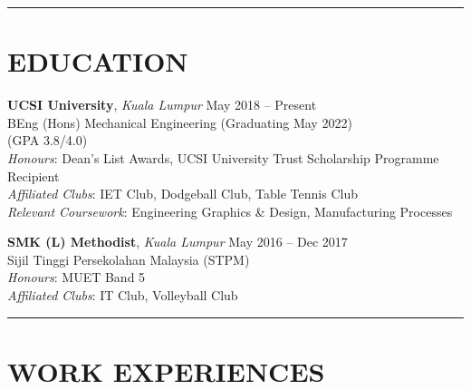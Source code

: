 \documentclass{article}
\begin{document}


\vspace{.09cm}
\noindent\rule[0.5ex]{\linewidth}{1pt}
\vspace{-1.5em}
\section{EDUCATION}
\begin{addmargin}[2em]{0em}
{\flushleft \bf UCSI University}, \textit{Kuala Lumpur} \hfill May 2018 -- Present\\
BEng (Hons) Mechanical Engineering \hfill (Graduating May 2022)\\
(GPA 3.8/4.0)\\
\textit{Honours}: Dean's List Awards, UCSI University Trust Scholarship Programme Recipient\\%
\textit{Affiliated Clubs}: IET Club, Dodgeball Club, Table Tennis Club\\
\textit{Relevant Coursework}: Engineering Graphics \& Design, Manufacturing Processes

\vspace{-.2em}

{\flushleft \bf SMK (L) Methodist}, \textit{Kuala Lumpur} \hfill May 2016 -- Dec 2017\\
Sijil Tinggi Persekolahan Malaysia (STPM)\\
\textit{Honours}: MUET Band 5\\
\textit{Affiliated Clubs}: IT Club, Volleyball Club
\end{addmargin}

\vspace{0em}

\noindent\rule[0.5ex]{\linewidth}{1pt}
\vspace{-1.5em}
\section{WORK EXPERIENCES} 
\end{document}
